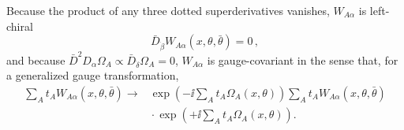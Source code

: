 Because the product of any three dotted superderivatives vanishes,
\(W_{A\alpha}\) is left-chiral
\begin{equation}
  \bar D_{\dot\beta}W_{A\alpha}(x,\theta,\bar\theta)=0\,,
  \tag{27.3.13}\label{eq:27.3.13}
\end{equation}
and because
\(\bar D^2D_\alpha\Omega_A\propto
\bar D_{\dot\delta}\Omega_A=0\),
\(W_{A\alpha}\) is gauge-covariant in the sense that, for a generalized
gauge transformation,
\begin{equation}
  \begin{aligned}
  \sum_A t_AW_{A\alpha}(x,\theta,\bar\theta)
  \longrightarrow{}&
  \exp\left(-\ii\sum_A t_A\Omega_A(x,\theta)\right)
  \sum_A t_AW_{A\alpha}(x,\theta,\bar\theta)
  \\
  &{}\cdot
  \exp\left(+\ii\sum_A t_A\Omega_A(x,\theta)\right).
  \end{aligned}
  \tag{27.3.14}\label{eq:27.3.14}
\end{equation}

